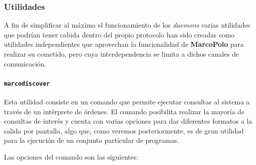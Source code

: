 



 
\subsubsection{Utilidades}

A fin de simplificar al máximo el funcionamiento de los \textit{daemons} varias utilidades que podrían tener cabida dentro del propio protocolo han sido creadas como utilidades independientes que aprovechan la funcionalidad de \textbf{MarcoPolo} para realizar su cometido, pero cuya interdependencia se limita a dichos canales de comunicación.

\paragraph{\texttt{marcodiscover}\\}
\label{marcodiscover}
Esta utilidad consiste en un comando que permite ejecutar consultas al sistema a través de un intérprete de órdenes. El comando posibilita realizar la mayoría de consultas de interés y cuenta con varias opciones para dar diferentes formatos a la salida por pantalla, algo que, como veremos posteriormente, es de gran utilidad para la ejecución de un conjunto particular de programas.

Las opciones del comando son las siguientes:

